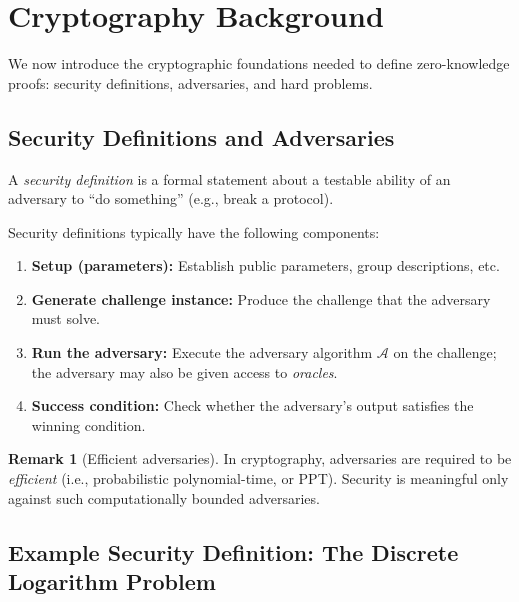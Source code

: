\documentclass[11pt]{article}
\theoremstyle{plain}
\theoremstyle{definition}
\newtheorem{remark}[theorem]{Remark}
\begin{document}
\section{Cryptography Background}

We now introduce the cryptographic foundations needed to define zero-knowledge proofs:
security definitions, adversaries, and hard problems.

\subsection{Security Definitions and Adversaries}

\begin{tcolorbox}[colback=blue!5!white, colframe=blue!50!black,
  title=What is a Security Definition?]
A \emph{security definition} is a formal statement about a testable ability of an adversary
to ``do something'' (e.g., break a protocol).
\end{tcolorbox}

Security definitions typically have the following components:

\begin{enumerate}[leftmargin=2em]
  \item \textbf{Setup (parameters):} Establish public parameters, group descriptions, etc.
  \item \textbf{Generate challenge instance:} Produce the challenge that the adversary must
        solve.
  \item \textbf{Run the adversary:} Execute the adversary algorithm $\mathcal{A}$ on the
        challenge; the adversary may also be given access to \emph{oracles}.
  \item \textbf{Success condition:} Check whether the adversary's output satisfies the
        winning condition.
\end{enumerate}

\begin{remark}[Efficient adversaries]
In cryptography, adversaries are required to be \emph{efficient} (i.e., probabilistic
polynomial-time, or PPT).  Security is meaningful only against such computationally
bounded adversaries.
\end{remark}

\subsection{Example Security Definition: The Discrete Logarithm Problem}
\end{document}
